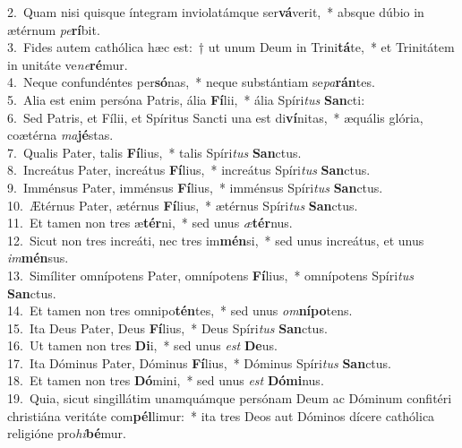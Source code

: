 {2.~}Quam nisi quisque íntegram inviolatámque ser\textbf{vá}verit,~* absque dúbio in ætérnum \textit{pe}\textbf{rí}bit.\\
{3.~}Fides autem cathólica hæc est:~† ut unum Deum in Trini\textbf{tá}te,~* et Trinitátem in unitáte ve\textit{ne}\textbf{ré}mur.\\
{4.~}Neque confundéntes per\textbf{só}nas,~* neque substántiam se\textit{pa}\textbf{rán}tes.\\
{5.~}Alia est enim persóna Patris, ália \textbf{Fí}lii,~* ália Spíri\textit{tus} \textbf{San}cti:\\
{6.~}Sed Patris, et Fílii, et Spíritus Sancti una est di\textbf{ví}nitas,~* æquális glória, coætérna \textit{ma}\textbf{jé}stas.\\
{7.~}Qualis Pater, talis \textbf{Fí}lius,~* talis Spíri\textit{tus} \textbf{San}ctus.\\
{8.~}Increátus Pater, increátus \textbf{Fí}lius,~* increátus Spíri\textit{tus} \textbf{San}ctus.\\
{9.~}Imménsus Pater, imménsus \textbf{Fí}lius,~* imménsus Spíri\textit{tus} \textbf{San}ctus.\\
{10.~}Ætérnus Pater, ætérnus \textbf{Fí}lius,~* ætérnus Spíri\textit{tus} \textbf{San}ctus.\\
{11.~}Et tamen non tres æ\textbf{tér}ni,~* sed unus \textit{æ}\textbf{tér}nus.\\
{12.~}Sicut non tres increáti, nec tres im\textbf{mén}si,~* sed unus increátus, et unus \textit{im}\textbf{mén}sus.\\
{13.~}Simíliter omnípotens Pater, omnípotens \textbf{Fí}lius,~* omnípotens Spíri\textit{tus} \textbf{San}ctus.\\
{14.~}Et tamen non tres omnipo\textbf{tén}tes,~* sed unus \textit{om}\textbf{ní}\textbf{po}tens.\\
{15.~}Ita Deus Pater, Deus \textbf{Fí}lius,~* Deus Spíri\textit{tus} \textbf{San}ctus.\\
{16.~}Ut tamen non tres \textbf{Di}i,~* sed unus \textit{est} \textbf{De}us.\\
{17.~}Ita Dóminus Pater, Dóminus \textbf{Fí}lius,~* Dóminus Spíri\textit{tus} \textbf{San}ctus.\\
{18.~}Et tamen non tres \textbf{Dó}mini,~* sed unus \textit{est} \textbf{Dó}\textbf{mi}nus.\\
{19.~}Quia, sicut singillátim unamquámque persónam Deum ac Dóminum confitéri christiána veritáte com\textbf{pél}limur:~* ita tres Deos aut Dóminos dícere cathólica religióne pro\textit{hi}\textbf{bé}mur.\\
